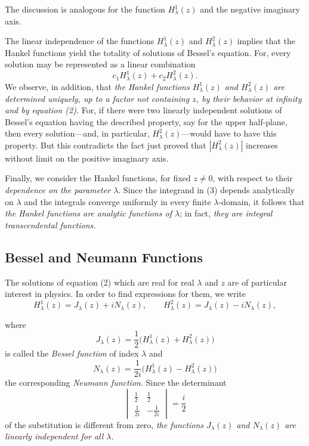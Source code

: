 The discussion is analogous for the function $H_\lambda^1(z)$ and the negative imaginary axis.

The linear independence of the functions $H_\lambda^1(z)$ and $H_\lambda^2(z)$ implies that the Hankel functions yield the totality of solutions of Bessel's equation. For, every solution may be represented as a linear combination
\[
c_1H_\lambda^1(z)+c_2H_\lambda^2(z).
\]
We observe, in addition, that \emph{the Hankel functions $H_\lambda^1(z)$ and $H_\lambda^2(z)$ are determined uniquely, up to a factor not containing $z$, by their behavior at infinity and by equation (2).} For, if there were two linearly independent solutions of Bessel's equation having the described property, say for the upper half-plane, then every solution---and, in particular, $H_\lambda^2(z)$---would have to have this property. But this contradicts the fact just proved that $|H_\lambda^2(z)|$ increases without limit on the positive imaginary axis.

Finally, we consider the Hankel functions, for fixed $z\ne0$, with respect to their \emph{dependence on the parameter $\lambda$}. Since the integrand in (3) depends analytically on $\lambda$ and the integrals converge uniformly in every finite $\lambda$-domain, it follows that \emph{the Hankel functions are analytic functions of $\lambda$}; in fact, \emph{they are integral transcendental functions.}

\subsection{Bessel and Neumann Functions}
The solutions of equation (2) which are real for real $\lambda$ and $z$ are of particular interest in physics. In order to find expressions for them, we write
\begin{equation}\tag{4}
H_\lambda^1(z)=J_\lambda(z)+iN_\lambda(z),\qquad
H_\lambda^2(z)=J_\lambda(z)-iN_\lambda(z),
\end{equation}

where
\begin{equation}\tag{5}
J_\lambda(z)=\frac12\bigl(H_\lambda^1(z)+H_\lambda^2(z)\bigr)
\end{equation}
is called the \emph{Bessel function} of index $\lambda$ and
\begin{equation}\tag{5'}
N_\lambda(z)=\frac1{2i}\bigl(H_\lambda^1(z)-H_\lambda^2(z)\bigr)
\end{equation}
the corresponding \emph{Neumann function}. Since the determinant
\[
\begin{vmatrix}
\frac12&\frac12\\[2pt]
\frac1{2i}&-\frac1{2i}
\end{vmatrix}=\frac i2
\]
of the substitution is different from zero, \emph{the functions $J_\lambda(z)$ and $N_\lambda(z)$ are linearly independent for all $\lambda$.}


